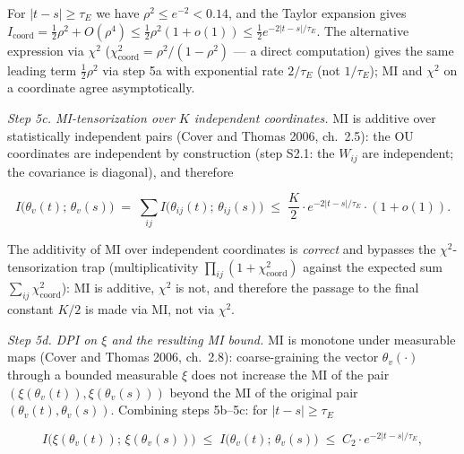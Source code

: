 \documentclass[pdflatex,sn-mathphys-ay]{sn-jnl}
\begin{document}
For \(|t-s| \ge \tau_E\) we have \(\rho^2 \le e^{-2} < 0.14\), and the Taylor expansion gives \(I_{\text{coord}} = \tfrac{1}{2}\rho^2 + O(\rho^4) \le \tfrac{1}{2}\rho^2(1 + o(1)) \le \tfrac{1}{2} e^{-2|t-s|/\tau_E}\). The alternative expression via \(\chi^2\) (\(\chi^2_{\text{coord}} = \rho^2/(1-\rho^2)\) --- a direct computation) gives the same leading term \(\tfrac{1}{2}\rho^2\) via step 5a with exponential rate \(2/\tau_E\) (not \(1/\tau_E\)); MI and \(\chi^2\) on a coordinate agree asymptotically.



\emph{Step 5c. MI-tensorization over \(K\) independent coordinates.} MI is additive over statistically independent pairs (Cover and Thomas 2006, ch.~2.5): the OU coordinates are independent by construction (step S2.1: the \(W_{ij}\) are independent; the covariance is diagonal), and therefore



\begin{equation}I\bigl(\theta_v(t);\, \theta_v(s)\bigr) \;=\; \sum_{ij} I\bigl(\theta_{ij}(t);\, \theta_{ij}(s)\bigr) \;\le\; \frac{K}{2} \cdot e^{-2|t-s|/\tau_E} \cdot (1 + o(1)). \tag{S1.5b}\end{equation}



The additivity of MI over independent coordinates is \emph{correct} and bypasses the \(\chi^2\)-tensorization trap (multiplicativity \(\prod_{ij}(1 + \chi^2_{\text{coord}})\) against the expected sum \(\sum_{ij} \chi^2_{\text{coord}}\)): MI is additive, \(\chi^2\) is not, and therefore the passage to the final constant \(K/2\) is made via MI, not via \(\chi^2\).



\emph{Step 5d. DPI on \(\xi\) and the resulting MI bound.} MI is monotone under measurable maps (Cover and Thomas 2006, ch.~2.8): coarse-graining the vector \(\theta_v(\cdot)\) through a bounded measurable \(\xi\) does not increase the MI of the pair \((\xi(\theta_v(t)), \xi(\theta_v(s)))\) beyond the MI of the original pair \((\theta_v(t), \theta_v(s))\). Combining steps 5b--5c: for \(|t-s| \ge \tau_E\)



\begin{equation}I\bigl(\xi(\theta_v(t));\, \xi(\theta_v(s))\bigr) \;\le\; I\bigl(\theta_v(t);\, \theta_v(s)\bigr) \;\le\; C_2 \cdot e^{-2|t-s|/\tau_E}, \tag{S1.5}\end{equation}
\end{document}
